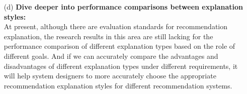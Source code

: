 \begin{itemize}
\item[(d)]{\textbf{Dive deeper into performance comparisons between explanation styles:}}\\
At present, although there are evaluation standards for recommendation explanation, the research results in this area are still lacking for the performance comparison of different explanation types based on the role of different goals. And if we can accurately compare the advantages and disadvantages of different explanation types under different requirements, it will help system designers to more accurately choose the appropriate recommendation explanation styles for different recommendation systems.



\end{itemize}
\cleardoublepage